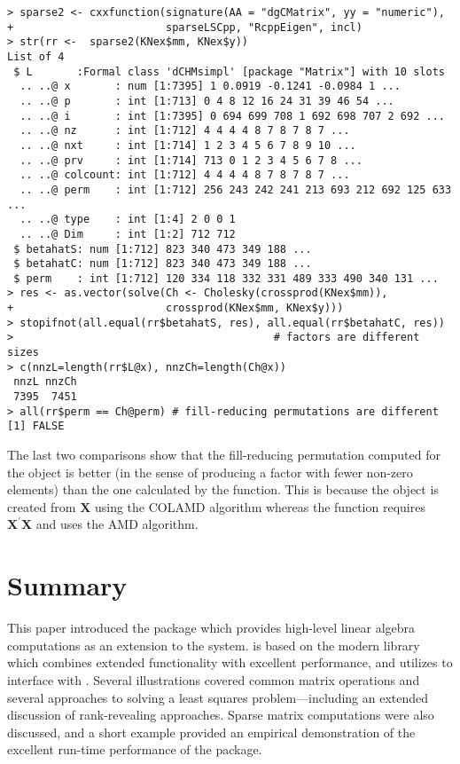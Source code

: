 \documentclass[shortnames,article,nojss]{jss}
\begin{document}
\begin{verbatim}
> sparse2 <- cxxfunction(signature(AA = "dgCMatrix", yy = "numeric"),
+                        sparseLSCpp, "RcppEigen", incl)
> str(rr <-  sparse2(KNex$mm, KNex$y))
List of 4
 $ L       :Formal class 'dCHMsimpl' [package "Matrix"] with 10 slots
  .. ..@ x       : num [1:7395] 1 0.0919 -0.1241 -0.0984 1 ...
  .. ..@ p       : int [1:713] 0 4 8 12 16 24 31 39 46 54 ...
  .. ..@ i       : int [1:7395] 0 694 699 708 1 692 698 707 2 692 ...
  .. ..@ nz      : int [1:712] 4 4 4 4 8 7 8 7 8 7 ...
  .. ..@ nxt     : int [1:714] 1 2 3 4 5 6 7 8 9 10 ...
  .. ..@ prv     : int [1:714] 713 0 1 2 3 4 5 6 7 8 ...
  .. ..@ colcount: int [1:712] 4 4 4 4 8 7 8 7 8 7 ...
  .. ..@ perm    : int [1:712] 256 243 242 241 213 693 212 692 125 633 ...
  .. ..@ type    : int [1:4] 2 0 0 1
  .. ..@ Dim     : int [1:2] 712 712
 $ betahatS: num [1:712] 823 340 473 349 188 ...
 $ betahatC: num [1:712] 823 340 473 349 188 ...
 $ perm    : int [1:712] 120 334 118 332 331 489 333 490 340 131 ...
> res <- as.vector(solve(Ch <- Cholesky(crossprod(KNex$mm)),
+                        crossprod(KNex$mm, KNex$y)))
> stopifnot(all.equal(rr$betahatS, res), all.equal(rr$betahatC, res))
>                                         # factors are different sizes
> c(nnzL=length(rr$L@x), nnzCh=length(Ch@x)) 
 nnzL nnzCh 
 7395  7451 
> all(rr$perm == Ch@perm) # fill-reducing permutations are different
[1] FALSE
\end{verbatim}

The last two comparisons show that the fill-reducing permutation
computed for the  object is better (in the sense of
producing a factor with fewer non-zero elements) than the one
calculated by the  function.  This is because
the  object is created from
$\bm X$ using the COLAMD algorithm whereas the 
function requires $\bm X^\prime\bm X$ and uses the AMD algorithm.


\section{Summary}

This paper introduced the  package which provides
high-level linear algebra computations as an extension to the
 system.   is based on the modern
 library  which combines extended
functionality with excellent performance, and utilizes  to
interface  with .  Several illustrations
covered common matrix operations and several approaches to solving a
least squares problem---including an extended discussion of
rank-revealing approaches. Sparse matrix computations were also
discussed, and a short example provided an empirical demonstration of
the excellent run-time performance of the  package.


\end{document}
